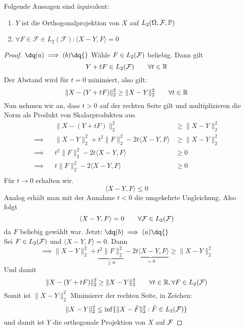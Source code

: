 \begin{proposition}\label{Prop1.3}
	Folgende Aussagen sind äquivalent:
	\renewcommand{\labelenumi}{(\alph{enumi})}
	\begin{enumerate}
		\item $Y$ ist die Orthogonalprojektion von $X$ auf $L_2(\Omega,\mathcal{F},\P)$ 
		\item $\forall F\in\mathcal{F}\in L_2(\mathcal{F}):\langle X-Y,F\rangle=0$
	\end{enumerate}
\end{proposition}
\begin{proof}
	$\dq (a) \implies (b) \dq{}$ \enter
	Wähle $F \in L_2(\F)$ beliebig. Dann gilt
	\[Y + tF \in L_2(\F) \qquad \forall t \in \R\]
	Der Abstand wird für $t=0$ minimiert, also gilt:
\[\|X-(Y+tF)\|_2^2 \geq \|X-Y\|_2^2 \qquad \forall t \in \R\]
Nun nehmen wir an, dass $t>0$ auf der rechten Seite gilt und multiplizieren die Norm als Produkt von Skalarprodukten aus.
\begin{align*}
	&&\|X-(Y+tF)\|_2^2 &\geq \|X-Y\|_2^2 \\
	\implies	&&\|X-Y\|_2^2 + t^2\|F\|_2^2 - 2t\langle X-Y, F \rangle &\geq \|X-Y\|_2^2 \\
	\implies	&&t^2\|F\|_2^2 - 2t\langle X-Y, F \rangle &\geq 0 \\
	\implies	&&t\|F\|_2^2 - 2\langle X-Y, F \rangle &\geq 0 \\
\end{align*}
Für $t\rightarrow0$ erhalten wir.
\[\langle X-Y, F \rangle \leq 0\]
Analog erhält man mit der Annahme $t<0$ die umgekehrte Ungleichung.
Also folgt
\[\langle X-Y, F \rangle = 0 \qquad \forall \F \in L_2(\F)\]
da $F$ beliebig gewählt war.\nl
Jetzt: $\dq (b) \implies (a) \dq{}$\\
Sei $F\in L_2(\F)$ und $\langle X-Y, F \rangle = 0$. Dann
\[\implies \|X-Y\|_2^2 + \underbrace{t^2\|F\|_2^2}_{\geq 0} - \underbrace{2t\langle X-Y, F \rangle}_{=0} \geq \|X-Y\|_2^2\]
Und damit 
\[\|X-(Y+tF)\|_2^2 \geq \|X-Y\|_2^2 \qquad \forall t\in\R, \forall F\in L_2(\F)\]
Somit ist $\|X-Y\|_2^2$ Minimierer der rechten Seite, in Zeichen:
\[\|X-Y\|_2^2 \leq \inf\{\|X-\tilde{F}\|_2^2 : \tilde{F}\in L_2(\F)\}\]
und damit ist $Y$ die orthogonale Projektion von $X$ auf $\F$
\end{proof}

